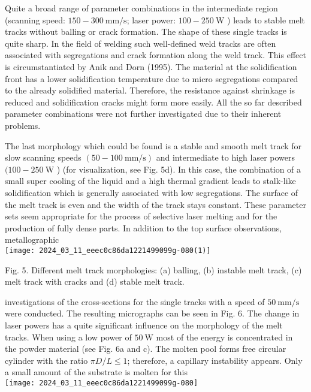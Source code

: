 \documentclass[10pt]{article}
\begin{document}
Quite a broad range of parameter combinations in the intermediate region (scanning speed: $150-300 \mathrm{~mm} / \mathrm{s}$; laser power: $100-250 \mathrm{~W}$ ) leads to stable melt tracks without balling or crack formation. The shape of these single tracks is quite sharp. In the field of welding such well-defined weld tracks are often associated with segregations and crack formation along the weld track. This effect is circumstantiated by Anik and Dorn (1995). The material at the solidification front has a lower solidification temperature due to micro segregations compared to the already solidified material. Therefore, the resistance against shrinkage is reduced and solidification cracks might form more easily. All the so far described parameter combinations were not further investigated due to their inherent problems.

The last morphology which could be found is a stable and smooth melt track for slow scanning speeds $(50-100 \mathrm{~mm} / \mathrm{s})$ and intermediate to high laser powers $(100-250 \mathrm{~W}$ ) (for visualization, see Fig. 5d). In this case, the combination of a small super cooling of the liquid and a high thermal gradient leads to stalk-like solidification which is generally associated with low segregations. The surface of the melt track is even and the width of the track stays constant. These parameter sets seem appropriate for the process of selective laser melting and for the production of fully dense parts. In addition to the top surface observations, metallographic\\
\texttt{[image: 2024\_03\_11\_eeec0c86da1221499099g-080(1)]}

Fig. 5. Different melt track morphologies: (a) balling, (b) instable melt track, (c) melt track with cracks and (d) stable melt track.

investigations of the cross-sections for the single tracks with a speed of $50 \mathrm{~mm} / \mathrm{s}$ were conducted. The resulting micrographs can be seen in Fig. 6. The change in laser powers has a quite significant influence on the morphology of the melt tracks. When using a low power of $50 \mathrm{~W}$ most of the energy is concentrated in the powder material (see Fig. 6a and c). The molten pool forms free circular cylinder with the ratio $\pi D / L \leq 1$; therefore, a capillary instability appears. Only a small amount of the substrate is molten for this\\
\texttt{[image: 2024\_03\_11\_eeec0c86da1221499099g-080]}
\end{document}
